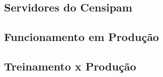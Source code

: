\subsection{Servidores do Censipam}
\subsection{Funcionamento em Produção}
\subsection{Treinamento x Produção}
\subsection{}











